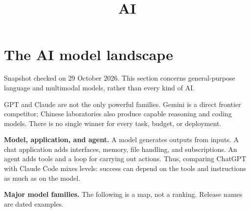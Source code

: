 



\title{AI}
\maketitle

\section{The AI model landscape}

Snapshot checked on 29 October 2026.
This section concerns general-purpose
language and multimodal models, rather
than every kind of AI.

GPT and Claude are not the only powerful
families. Gemini is a direct frontier
competitor; Chinese laboratories also
produce capable reasoning and coding
models. There is no single winner for
every task, budget, or deployment.

\medskip\noindent
\textbf{Model, application, and agent.}
A model generates outputs from inputs.
A chat application adds interfaces,
memory, file handling, and subscriptions.
An agent adds tools and a loop for
carrying out actions. Thus, comparing
ChatGPT with Claude Code mixes levels:
success can depend on the tools and
instructions as much as on the model.

\medskip\noindent
\textbf{Major model families.}
The following is a map, not a ranking.
Release names are dated examples.

